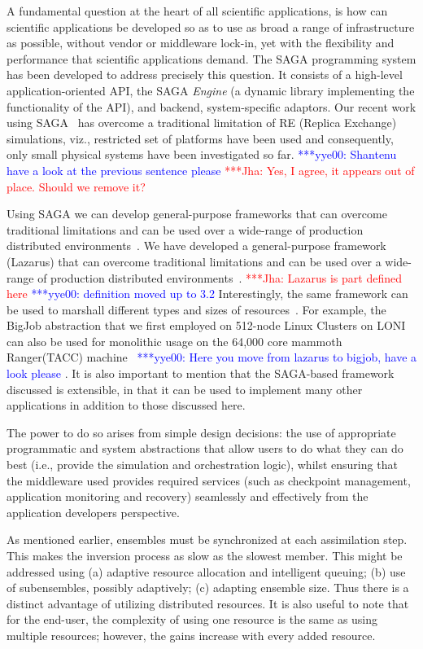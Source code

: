 \documentclass{acm_proc_article-sp}
\newcommand{\jhanote}[1]{ {\textcolor{red} { ***Jha: #1 }}}
\newcommand{\yyenote}[1]{ {\textcolor{blue} { ***yye00: #1 }}}
\newcommand{\jhanote}[1]{}
\newcommand{\yyenote}[1]{}
\begin{document}
A fundamental question at the heart of all scientific applications, is
how can scientific applications be developed so as to use as broad a
range of infrastructure as possible, without vendor or middleware
lock-in, yet with the flexibility and performance that scientific
applications demand. The SAGA programming system has been developed to
address precisely this question. It consists of a high-level
application-oriented API, the SAGA {\it Engine} (a dynamic library
implementing the functionality of the API), and backend,
system-specific adaptors.  Our recent work using
SAGA~\cite{saga-papers} has overcome a traditional limitation of RE
(Replica Exchange) simulations, viz., restricted set of platforms have
been used and consequently, only small physical systems have been
investigated so far.\yyenote{Shantenu have a look at the previous
  sentence please} \jhanote{Yes, I agree, it appears out of
  place. Should we remove it?}

Using SAGA we can develop general-purpose frameworks that can overcome
traditional limitations and can be used over a wide-range of production
distributed environments~\cite{saga-royalsoc}. We have developed a general-purpose
framework (Lazarus) that can overcome traditional
limitations and can be used over a wide-range of production
distributed environments~\cite{saga-royalsoc}.  \jhanote{Lazarus is
  part defined here}\yyenote{definition moved up to 3.2} Interestingly, the same framework can be used to
marshall different types and sizes of
resources~\cite{saga-papers}. For example, the BigJob abstraction that
we first employed on 512-node Linux Clusters on LONI can also be used
for monolithic usage on the 64,000 core mammoth Ranger(TACC)
machine~\cite{saga-iccs09}\yyenote{Here you move from lazarus to bigjob, have a look please}.
It is also important to mention that the
SAGA-based framework discussed is extensible, in that it can be used
to implement many other applications in addition to those discussed
here.

The power to do so arises from simple design decisions: the use of
appropriate programmatic and system abstractions that allow users to
do what they can do best (i.e., provide the simulation and
orchestration logic), whilst ensuring that the middleware used
provides required services (such as checkpoint management, application
monitoring and recovery) seamlessly and effectively from the
application developers perspective. 

As mentioned earlier, ensembles must be synchronized at each
assimilation step. This makes the inversion process as slow as the
slowest member. This might be addressed using (a) adaptive resource
allocation and intelligent queuing; (b) use of subensembles, possibly
adaptively; (c) adapting ensemble size.  Thus there is a distinct
advantage of utilizing distributed resources.  It is also useful to
note that for the end-user, the complexity of using one resource is
the same as using multiple resources; however, the gains increase with
every added resource.
\end{document}
